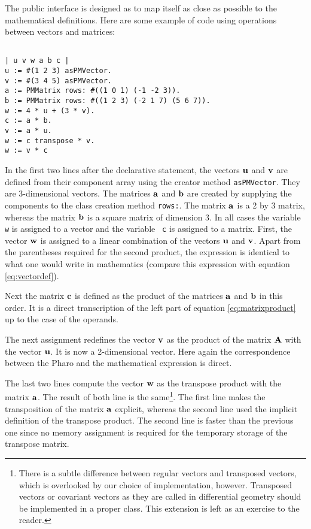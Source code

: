 \documentclass[twoside]{book}
\begin{document}
The public interface is designed as to map itself as close as
possible to the mathematical definitions. Here are some example of
code using operations between vectors and matrices:
\begin{codeExample}
\begin{verbatim}

| u v w a b c |
u := #(1 2 3) asPMVector.
v := #(3 4 5) asPMVector.
a := PMMatrix rows: #((1 0 1) (-1 -2 3)).
b := PMMatrix rows: #((1 2 3) (-2 1 7) (5 6 7)).
w := 4 * u + (3 * v).
c := a * b.
v := a * u.
w := c transpose * v.
w := v * c
\end{verbatim}
\end{codeExample}
In the first two lines after the declarative statement, the
vectors ${\bf u}$ and ${\bf v}$ are defined from their component
array using the creator method {\tt asPMVector}. They are
3-dimensional vectors. The matrices ${\bf a}$ and ${\bf b}$ are
created by supplying the components to the class creation method
{\tt rows:}. The matrix ${\bf a}$ is a 2 by 3 matrix, whereas the
matrix ${\bf b}$ is a square matrix of dimension 3. In all cases
the variable {\tt w} is assigned to a vector and the variable {\tt
c} is assigned to a matrix. First, the vector ${\bf w}$ is
assigned to a linear combination of the vectors ${\bf u}$ and
${\bf v}$. Apart from the parentheses required for the second
product, the expression is identical to what one would write in
mathematics (compare this expression with equation
\ref{eq:vectordef}).

Next the matrix ${\bf c}$ is defined as the product of the
matrices ${\bf a}$ and ${\bf b}$ in this order. It is a direct
transcription of the left part of equation \ref{eq:matrixproduct}
up to the case of the operands.

The next assignment redefines the vector ${\bf v}$ as the product
of the matrix ${\bf A}$ with the vector ${\bf u}$. It is now a
2-dimensional vector. Here again the correspondence between the
Pharo and the mathematical expression is direct.

The last two lines compute the vector ${\bf w}$ as the transpose
product with the matrix ${\bf a}$. The result of both line is the
same\footnote{\label{ft:covariant}There is a subtle difference
between regular vectors and transposed vectors, which is
overlooked by our choice of implementation, however. Transposed
vectors or covariant vectors as they are called in differential
geometry should be implemented in a proper class. This extension
is left as an exercise to the reader.}. The first line makes the
transposition of the matrix ${\bf a}$ explicit, whereas the second
line used the implicit definition of the transpose product. The
second line is faster than the previous one since no memory
assignment is required for the temporary storage of the transpose
matrix.
\end{document}
